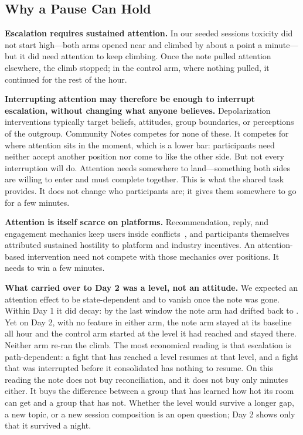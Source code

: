 \documentclass[manuscript,screen,review,anonymous]{acmart}
\begin{document}
\subsection{Why a Pause Can Hold}
\label{sec:pause}

\textbf{Escalation requires sustained attention.} In our seeded sessions
toxicity did not start high---both arms opened near \StatexptWinFirst{} and
climbed by about a point a minute---but it did need attention to keep
climbing. Once the note pulled attention elsewhere, the climb stopped; in
the control arm, where nothing pulled, it continued for the rest of the
hour.

\textbf{Interrupting attention may therefore be enough to interrupt
escalation, without changing what anyone believes.} Depolarization
interventions typically target beliefs, attitudes, group boundaries, or
perceptions of the outgroup. Community Notes competes for none of these. It
competes for where attention sits in the moment, which is a lower bar:
participants need neither accept another position nor come to like the other
side. But not every interruption will do. Attention needs somewhere to
land---something both sides are willing to enter and must complete together.
This is what the shared task provides. It does not change who participants
are; it gives them somewhere to go for a few minutes.

\textbf{Attention is itself scarce on platforms.} Recommendation, reply, and
engagement mechanics keep users inside conflicts~\cite{rathje2021}, and
participants themselves attributed sustained hostility to platform and
industry incentives. An attention-based intervention need not compete with
those mechanics over positions. It needs to win a few minutes.

\textbf{What carried over to Day 2 was a level, not an attitude.} We
expected an attention effect to be state-dependent and to vanish once the
note was gone. Within Day 1 it did decay: by the last window the note arm
had drifted back to \StatexptWinLast. Yet on Day 2, with no feature in
either arm, the note arm stayed at its baseline all hour and the control arm
started at the level it had reached and stayed there. Neither arm re-ran
the climb. The most economical reading is that escalation is path-dependent:
a fight that has reached a level resumes at that level, and a fight that
was interrupted before it consolidated has nothing to resume. On this
reading the note does not buy reconciliation, and it does not buy only
minutes either. It buys the difference between a group that has learned how
hot its room can get and a group that has not. Whether the level would
survive a longer gap, a new topic, or a new session composition is an open
question; Day 2 shows only that it survived a night.
\end{document}
